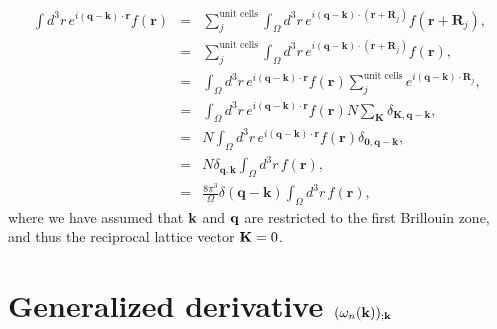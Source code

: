 \documentclass[floatfix,prb,aps,superscriptaddress,11pt,preprint]{revtex4}
\begin{document}
\begin{eqnarray}\label{a_6}
\int d^{3}r\, e^{i(\mathbf{q}-\mathbf{k})\cdot\mathbf{r}}f(\mathbf{r})
& = &
\sum_{j}^{\mbox{unit cells}}\int_{\Omega}d^{3}r\,
e^{i(\mathbf{q}-\mathbf{k})\cdot(\mathbf{r}+\mathbf{R}_{j})}f(\mathbf{r}+\mathbf{R}_{j}),
\nonumber
\\
 & =&\sum_{j}^{\mbox{unit cells}}\int_{\Omega}d^{3}r\,
 e^{i(\mathbf{q}-\mathbf{k})\cdot(\mathbf{r}+\mathbf{R}_{j})}f(\mathbf{r}),
\nonumber
\\
 & =&\int_{\Omega}d^{3}r\, e^{i(\mathbf{q}-\mathbf{k})\cdot\mathbf{r}}f(\mathbf{r})\sum_{j}^{\mbox{unit cells}}e^{i(\mathbf{q}-\mathbf{k})\cdot\mathbf{R}_{j}},\nonumber
\\
 & =&\int_{\Omega}d^{3}r\, e^{i(\mathbf{q}-\mathbf{k})\cdot\mathbf{r}}f(\mathbf{r})N\sum_{\mathbf{K}}\delta_{\mathbf{K},\mathbf{q}-\mathbf{k}},\nonumber
\\
 & =&N\int_{\Omega}d^{3}r\, e^{i(\mathbf{q}-\mathbf{k})\cdot\mathbf{r}}f(\mathbf{r})\delta_{\mathbf{0},\mathbf{q}-\mathbf{k}},\nonumber
\\
 & =&N\delta_{\mathbf{q},\mathbf{k}}\int_{\Omega}d^{3}r\, f(\mathbf{r}),\nonumber
\\
 &
 =&\frac{8\pi^{3}}{\Omega}\delta(\mathbf{q}-\mathbf{k})\int_{\Omega}d^{3}r\,
 f(\mathbf{r})
,
\end{eqnarray}
where we have assumed that $\mathbf{k}$ and $\mathbf{q}$ are restricted to the
first Brillouin zone, and thus the reciprocal lattice vector $\mathbf{K}=0$.

\section{Generalized derivative $(\omega_n(\mathbf{k}))_{;\mathbf{k}}$}\label{gwk}
\end{document}
